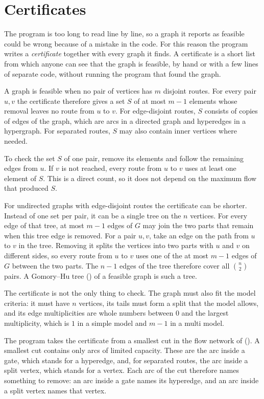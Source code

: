 \section{Certificates}\label{sec:certificates}

The program is too long to read line by line, so a graph it reports as feasible could be wrong because of a mistake in the code.
For this reason the program writes a \emph{certificate} together with every graph it finds.
A certificate is a short list from which anyone can see that the graph is feasible, by hand or with a few lines of separate code, without running the program that found the graph.

A graph is feasible when no pair of vertices has $m$ disjoint routes.
For every pair $u,v$ the certificate therefore gives a set $S$ of at most $m-1$ elements whose removal leaves no route from $u$ to $v$.
For edge-disjoint routes, $S$ consists of copies of edges of the graph, which are arcs in a directed graph and hyperedges in a hypergraph.
For separated routes, $S$ may also contain inner vertices where needed.

To check the set $S$ of one pair, remove its elements and follow the remaining edges from $u$.
If $v$ is not reached, every route from $u$ to $v$ uses at least one element of $S$.
This is a direct count, so it does not depend on the maximum flow that produced $S$.

For undirected graphs with edge-disjoint routes the certificate can be shorter.
Instead of one set per pair, it can be a single tree on the $n$ vertices.
For every edge of that tree, at most $m-1$ edges of $G$ may join the two parts that remain when this tree edge is removed.
For a pair $u,v$, take an edge on the path from $u$ to $v$ in the tree. Removing it splits the vertices into two parts with $u$ and $v$ on different sides, so every route from $u$ to $v$ uses one of the at most $m-1$ edges of $G$ between the two parts.
The $n-1$ edges of the tree therefore cover all $\binom n2$ pairs.
A Gomory--Hu tree () of a feasible graph is such a tree.

The certificate is not the only thing to check.
The graph must also fit the model criteria: it must have $n$ vertices, its tails must form a split that the model allows, and its edge multiplicities are whole numbers between $0$ and the largest multiplicity, which is $1$ in a simple model and $m-1$ in a multi model.

The program takes the certificate from a smallest cut in the flow network of  ().
A smallest cut contains only arcs of limited capacity. These are the arc inside a gate, which stands for a hyperedge, and, for separated routes, the arc inside a split vertex, which stands for a vertex.
Each arc of the cut therefore names something to remove: an arc inside a gate names its hyperedge, and an arc inside a split vertex names that vertex.

